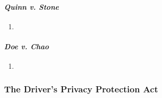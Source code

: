 
\paragraph{\emph{Quinn v. Stone}} %

\begin{enumerate}
    \item 
\end{enumerate}

\paragraph{\emph{Doe v. Chao}} %

\begin{enumerate}
    \item 
\end{enumerate}

\subsubsection{The Driver's Privacy Protection Act}

